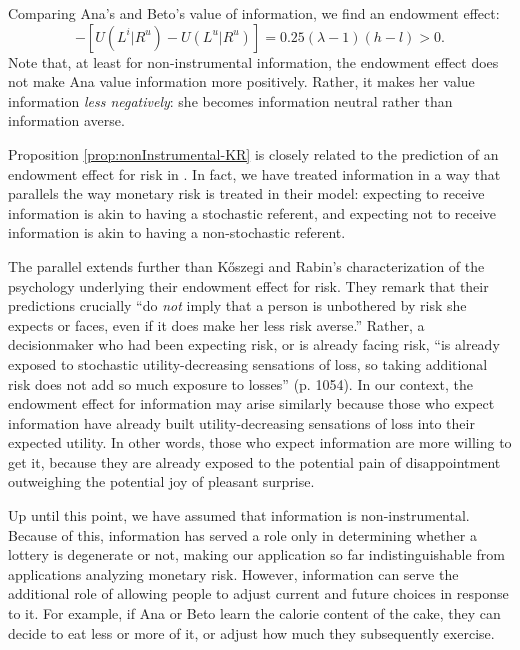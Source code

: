 \documentclass[12pt]{article}
\begin{document}
Comparing Ana's and Beto's value of information, we find an endowment effect:
\begin{equation*}
  [U(L^i|R^i)-U(L^u|R^i)]-[U(L^i|R^u)-U(L^u|R^u)]=0.25(\lambda-1)(h-l)>0.
\end{equation*}
Note that, at least for non-instrumental information, the endowment effect does not make Ana value information more positively. Rather, it makes her value information \emph{less negatively}: she becomes information neutral rather than information averse.

Proposition \ref{prop:nonInstrumental-KR} is closely related to the prediction of an endowment effect for risk in \citet{koszegiReferenceDependentRiskAttitudes2007}. In fact, we have treated information in a way that parallels the way monetary risk is treated in their model: expecting to receive information is akin to having a stochastic referent, and expecting not to receive information is akin to having a non-stochastic referent.

The parallel extends further than Kőszegi and Rabin’s characterization of the psychology underlying their endowment effect for risk. They remark that their predictions crucially \enquote{do \emph{not} imply that a person is unbothered by risk she expects or faces, even if it does make her less risk averse.} Rather, a decisionmaker who had been expecting risk, or is already facing risk, \enquote{is already exposed to stochastic utility-decreasing sensations of loss, so taking additional risk does not add so much exposure to losses} (p. 1054). In our context, the endowment effect for information may arise similarly because those who expect information have already built utility-decreasing sensations of loss into their expected utility. In other words, those who expect information are more willing to get it, because they are already exposed to the potential pain of disappointment outweighing the potential joy of pleasant surprise.

\FloatBarrier

Up until this point, we have assumed that information is non-instrumental. Because of this, information has served a role only in determining whether a lottery is degenerate or not, making our application so far indistinguishable from applications analyzing monetary risk. However, information can serve the additional role of allowing people to adjust current and future choices in response to it. For example, if Ana or Beto learn the calorie content of the cake, they can decide to eat less or more of  it, or adjust how much they subsequently exercise.
\end{document}
